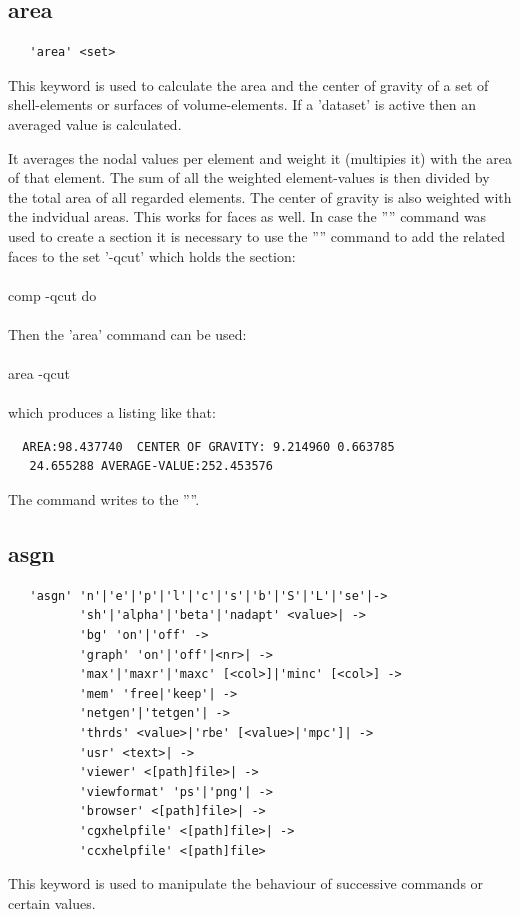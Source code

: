 \documentclass{article}
\begin{document}
\subsection{\label{area}area}
\begin{verbatim}
   'area' <set> 
\end{verbatim}
This keyword is used to calculate the area and the center of gravity of a set of shell-elements or surfaces of volume-elements. If a 'dataset' is active then an averaged value is calculated.

It averages the nodal values per element and weight it (multipies it) with the area of that element. The sum of all the weighted element-values is then divided by the total area of all regarded elements. The center of gravity is also weighted with the indvidual areas. This works for faces as well. In case the '''' command was used to create a section it is necessary to use the '''' command to add the related faces to the set '-qcut' which holds the section:\\\\comp -qcut do\\\\Then the 'area' command can be used:\\\\area -qcut\\\\which produces a listing like that:
\begin{verbatim}
  AREA:98.437740  CENTER OF GRAVITY: 9.214960 0.663785
   24.655288 AVERAGE-VALUE:252.453576
\end{verbatim}

The command writes to the ''''.

\subsection{\label{asgn}asgn}
\begin{verbatim}
   'asgn' 'n'|'e'|'p'|'l'|'c'|'s'|'b'|'S'|'L'|'se'|->
          'sh'|'alpha'|'beta'|'nadapt' <value>| ->
          'bg' 'on'|'off' ->
          'graph' 'on'|'off'|<nr>| ->
          'max'|'maxr'|'maxc' [<col>]|'minc' [<col>] ->
          'mem' 'free|'keep'| ->
          'netgen'|'tetgen'| ->
          'thrds' <value>|'rbe' [<value>|'mpc']| ->
          'usr' <text>| ->
          'viewer' <[path]file>| ->
          'viewformat' 'ps'|'png'| ->
          'browser' <[path]file>| ->
          'cgxhelpfile' <[path]file>| ->
          'ccxhelpfile' <[path]file>
\end{verbatim}
This keyword is used to manipulate the behaviour of successive commands or certain values.
\end{document}
